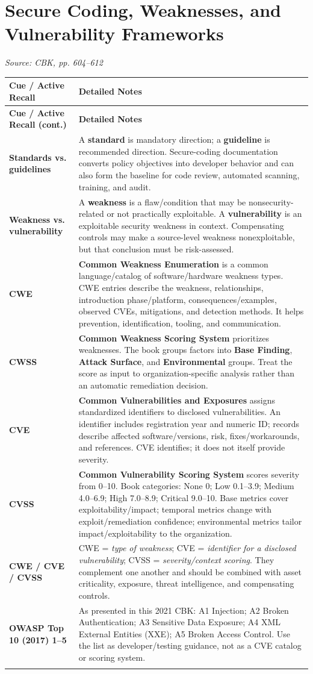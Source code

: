 \documentclass[10pt,letterpaper]{article}
\makeatletter
\newenvironment{cornell}{\rowcolors{2}{white}{notebg}\begin{longtable}{@{}>{\raggedright\arraybackslash\columncolor{cuebg}\color{navy}\bfseries}p{0.285\textwidth}>{\raggedright\arraybackslash}p{0.65\textwidth}@{}}\rowcolor{navy}\color{white}\textbf{Cue / Active Recall} & \color{white}\textbf{Detailed Notes}\\ \hline\endfirsthead\rowcolor{navy}\color{white}\textbf{Cue / Active Recall (cont.)} & \color{white}\textbf{Detailed Notes}\\ \hline\endhead}{\end{longtable}}
\newcommand{\noterow}[2]{#1 & #2\\\arrayrulecolor{line}\hline}\newcommand{\source}[1]{\par{\footnotesize\color{teal}\textit{Source: CBK, #1}}\par}
\makeatother
\begin{document}
\section{\color{navy}Secure Coding, Weaknesses, and Vulnerability Frameworks}
\source{pp. 604--612}
\begin{cornell}
\noterow{Standards vs. guidelines}{A \textbf{standard} is mandatory direction; a \textbf{guideline} is recommended direction. Secure-coding documentation converts policy objectives into developer behavior and can also form the baseline for code review, automated scanning, training, and audit.}
\noterow{Weakness vs. vulnerability}{A \textbf{weakness} is a flaw/condition that may be nonsecurity-related or not practically exploitable. A \textbf{vulnerability} is an exploitable security weakness in context. Compensating controls may make a source-level weakness nonexploitable, but that conclusion must be risk-assessed.}
\noterow{CWE}{\textbf{Common Weakness Enumeration} is a common language/catalog of software/hardware weakness types. CWE entries describe the weakness, relationships, introduction phase/platform, consequences/examples, observed CVEs, mitigations, and detection methods. It helps prevention, identification, tooling, and communication.}
\noterow{CWSS}{\textbf{Common Weakness Scoring System} prioritizes weaknesses. The book groups factors into \textbf{Base Finding}, \textbf{Attack Surface}, and \textbf{Environmental} groups. Treat the score as input to organization-specific analysis rather than an automatic remediation decision.}
\noterow{CVE}{\textbf{Common Vulnerabilities and Exposures} assigns standardized identifiers to disclosed vulnerabilities. An identifier includes registration year and numeric ID; records describe affected software/versions, risk, fixes/workarounds, and references. CVE identifies; it does not itself provide severity.}
\noterow{CVSS}{\textbf{Common Vulnerability Scoring System} scores severity from 0--10. Book categories: None 0; Low 0.1--3.9; Medium 4.0--6.9; High 7.0--8.9; Critical 9.0--10. Base metrics cover exploitability/impact; temporal metrics change with exploit/remediation confidence; environmental metrics tailor impact/exploitability to the organization.}
\noterow{CWE / CVE / CVSS}{CWE = \emph{type of weakness}; CVE = \emph{identifier for a disclosed vulnerability}; CVSS = \emph{severity/context scoring}. They complement one another and should be combined with asset criticality, exposure, threat intelligence, and compensating controls.}
\noterow{OWASP Top 10 (2017) 1--5}{As presented in this 2021 CBK: A1 Injection; A2 Broken Authentication; A3 Sensitive Data Exposure; A4 XML External Entities (XXE); A5 Broken Access Control. Use the list as developer/testing guidance, not as a CVE catalog or scoring system.}

\end{cornell}
\end{document}
